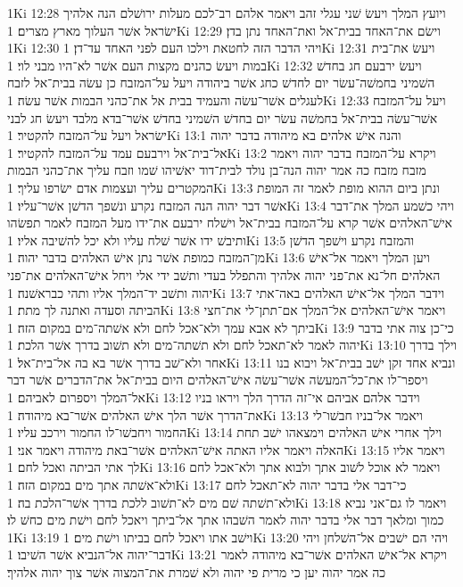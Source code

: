 1Ki 12:28  ויועץ המלך ויעשׂ שׁני עגלי זהב ויאמר אלהם רב־לכם מעלות ירושׁלם הנה אלהיך ישׂראל אשׁר העלוך מארץ מצרים׃
1Ki 12:29  וישׂם את־האחד בבית־אל ואת־האחד נתן בדן׃
1Ki 12:30  ויהי הדבר הזה לחטאת וילכו העם לפני האחד עד־דן׃
1Ki 12:31  ויעשׂ את־בית במות ויעשׂ כהנים מקצות העם אשׁר לא־היו מבני לוי׃
1Ki 12:32  ויעשׂ ירבעם חג בחדשׁ השׁמיני בחמשׁה־עשׂר יום לחדשׁ כחג אשׁר ביהודה ויעל על־המזבח כן עשׂה בבית־אל לזבח לעגלים אשׁר־עשׂה והעמיד בבית אל את־כהני הבמות אשׁר עשׂה׃
1Ki 12:33  ויעל על־המזבח אשׁר־עשׂה בבית־אל בחמשׁה עשׂר יום בחדשׁ השׁמיני בחדשׁ אשׁר־בדא מלבד ויעשׂ חג לבני ישׂראל ויעל על־המזבח להקטיר׃
1Ki 13:1  והנה אישׁ אלהים בא מיהודה בדבר יהוה אל־בית־אל וירבעם עמד על־המזבח להקטיר׃
1Ki 13:2  ויקרא על־המזבח בדבר יהוה ויאמר מזבח מזבח כה אמר יהוה הנה־בן נולד לבית־דוד יאשׁיהו שׁמו וזבח עליך את־כהני הבמות המקטרים עליך ועצמות אדם ישׂרפו עליך׃
1Ki 13:3  ונתן ביום ההוא מופת לאמר זה המופת אשׁר דבר יהוה הנה המזבח נקרע ונשׁפך הדשׁן אשׁר־עליו׃
1Ki 13:4  ויהי כשׁמע המלך את־דבר אישׁ־האלהים אשׁר קרא על־המזבח בבית־אל וישׁלח ירבעם את־ידו מעל המזבח לאמר תפשׂהו ותיבשׁ ידו אשׁר שׁלח עליו ולא יכל להשׁיבה אליו׃
1Ki 13:5  והמזבח נקרע וישׁפך הדשׁן מן־המזבח כמופת אשׁר נתן אישׁ האלהים בדבר יהוה׃
1Ki 13:6  ויען המלך ויאמר אל־אישׁ האלהים חל־נא את־פני יהוה אלהיך והתפלל בעדי ותשׁב ידי אלי ויחל אישׁ־האלהים את־פני יהוה ותשׁב יד־המלך אליו ותהי כבראשׁנה׃
1Ki 13:7  וידבר המלך אל־אישׁ האלהים באה־אתי הביתה וסעדה ואתנה לך מתת׃
1Ki 13:8  ויאמר אישׁ־האלהים אל־המלך אם־תתן־לי את־חצי ביתך לא אבא עמך ולא־אכל לחם ולא אשׁתה־מים במקום הזה׃
1Ki 13:9  כי־כן צוה אתי בדבר יהוה לאמר לא־תאכל לחם ולא תשׁתה־מים ולא תשׁוב בדרך אשׁר הלכת׃
1Ki 13:10  וילך בדרך אחר ולא־שׁב בדרך אשׁר בא בה אל־בית־אל׃
1Ki 13:11  ונביא אחד זקן ישׁב בבית־אל ויבוא בנו ויספר־לו את־כל־המעשׂה אשׁר־עשׂה אישׁ־האלהים היום בבית־אל את־הדברים אשׁר דבר אל־המלך ויספרום לאביהם׃
1Ki 13:12  וידבר אלהם אביהם אי־זה הדרך הלך ויראו בניו את־הדרך אשׁר הלך אישׁ האלהים אשׁר־בא מיהודה׃
1Ki 13:13  ויאמר אל־בניו חבשׁו־לי החמור ויחבשׁו־לו החמור וירכב עליו׃
1Ki 13:14  וילך אחרי אישׁ האלהים וימצאהו ישׁב תחת האלה ויאמר אליו האתה אישׁ־האלהים אשׁר־באת מיהודה ויאמר אני׃
1Ki 13:15  ויאמר אליו לך אתי הביתה ואכל לחם׃
1Ki 13:16  ויאמר לא אוכל לשׁוב אתך ולבוא אתך ולא־אכל לחם ולא־אשׁתה אתך מים במקום הזה׃
1Ki 13:17  כי־דבר אלי בדבר יהוה לא־תאכל לחם ולא־תשׁתה שׁם מים לא־תשׁוב ללכת בדרך אשׁר־הלכת בה׃
1Ki 13:18  ויאמר לו גם־אני נביא כמוך ומלאך דבר אלי בדבר יהוה לאמר השׁבהו אתך אל־ביתך ויאכל לחם וישׁת מים כחשׁ לו׃
1Ki 13:19  וישׁב אתו ויאכל לחם בביתו וישׁת מים׃
1Ki 13:20  ויהי הם ישׁבים אל־השׁלחן ויהי דבר־יהוה אל־הנביא אשׁר השׁיבו׃
1Ki 13:21  ויקרא אל־אישׁ האלהים אשׁר־בא מיהודה לאמר כה אמר יהוה יען כי מרית פי יהוה ולא שׁמרת את־המצוה אשׁר צוך יהוה אלהיך׃
